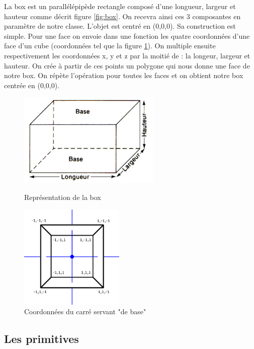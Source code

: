 \documentclass{article}
\begin{document}
La box est un parallélépipède rectangle composé d'une longueur, largeur et hauteur comme décrit figure \ref{fig:box}. On recevra ainsi ces 3 composantes en paramètre de notre classe. L'objet est centré en (0,0,0). Sa construction est simple. Pour une face on envoie dans une fonction les quatre coordonnées d'une face d'un cube (coordonnées tel que la figure \ref{fig:box_construction}). On multiple ensuite respectivement les coordonnées x, y et z par la moitié de : la longeur, largeur et hauteur. On crée à partir de ces points un polygone qui nous donne une face de notre box. On répète l'opération pour toutes les faces et on obtient notre box centrée en (0,0,0).


\begin{figure}[!htb]
	\begin{minipage}{0.5\textwidth}
    	\centering
    	\includegraphics[height=4.5cm]{./assets/box.jpg}
    	\caption{Représentation de la box}
    	\label{fig:box}
	\end{minipage}
	\hfill
	\begin{minipage}{0.5\textwidth}
    	\centering
    	\includegraphics[height=5cm]{./assets/box_construction.png}
    	\caption{Coordonnées du carré servant "de base"}
    	\label{fig:box_construction}
	\end{minipage}
\end{figure}

\subsection{Les primitives}
\end{document}
